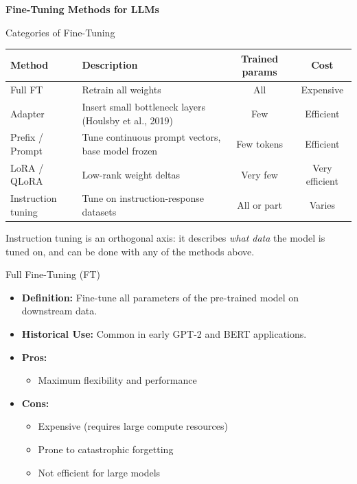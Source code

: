 \begin{frame}[plain]
  \centering
  \vspace*{0.18\paperheight}
  \LARGE \textbf{Fine-Tuning Methods for LLMs}
\end{frame}

\begin{frame}{Categories of Fine-Tuning}
  \begin{center}
    \small
    \renewcommand{\arraystretch}{1.4}
    \begin{tabular}{|l|>{\raggedright\arraybackslash}p{5.6cm}|c|c|}
      \hline
      \textbf{Method} & \textbf{Description} & \textbf{Trained params} & \textbf{Cost} \\
      \hline
      Full FT & Retrain all weights & All & Expensive \\
      Adapter & Insert small bottleneck layers (Houlsby et al., 2019) & Few & Efficient \\
      Prefix / Prompt & Tune continuous prompt vectors, base model frozen & Few tokens & Efficient \\
      LoRA / QLoRA & Low-rank weight deltas & Very few & Very efficient \\
      Instruction tuning & Tune on instruction-response datasets & All or part & Varies \\
      \hline
    \end{tabular}
  \end{center}
  \vspace{0.4em}
  {\scriptsize Instruction tuning is an orthogonal axis: it describes \emph{what data} the model is tuned on, and can be done with any of the methods above.}
\end{frame}

\begin{frame}[t]{Full Fine-Tuning (FT)}
  \begin{itemize}
    \item[\textcolor{red}{$\blacktriangleright$}] \textbf{Definition:} Fine-tune all parameters of the pre-trained model on downstream data.
    \item[\textcolor{red}{$\blacktriangleright$}] \textbf{Historical Use:} Common in early GPT-2 and BERT applications.
    \item[\textcolor{red}{$\blacktriangleright$}] \textbf{Pros:}
      \begin{itemize}
        \item Maximum flexibility and performance
      \end{itemize}
    \item[\textcolor{red}{$\blacktriangleright$}] \textbf{Cons:}
      \begin{itemize}
        \item Expensive (requires large compute resources)
        \item Prone to catastrophic forgetting
        \item Not efficient for large models
      \end{itemize}
  \end{itemize}
\end{frame}

